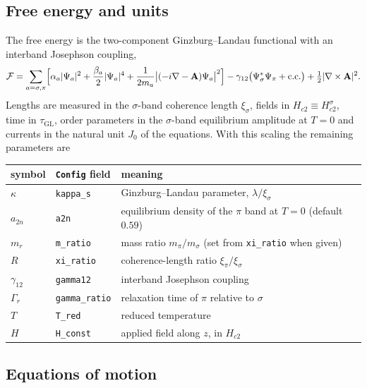 \documentclass[11pt,a4paper]{article}
\newcommand{\Hc}[1]{H_{c#1}}
\newcommand{\tGL}{\tau_{\mathrm{GL}}}
\newcommand{\code}[1]{\texttt{#1}}
\begin{document}
\subsection{Free energy and units}

The free energy is the two-component Ginzburg--Landau functional with an
interband Josephson coupling,
\begin{equation}
  \mathcal{F} = \sum_{a=\sigma,\pi}\Bigl[
      \alpha_a|\Psi_a|^2 + \frac{\beta_a}{2}|\Psi_a|^4
    + \frac{1}{2m_a}\bigl|(-i\nabla-\mathbf{A})\Psi_a\bigr|^2 \Bigr]
  - \gamma_{12}\bigl(\Psi_\sigma^{*}\Psi_\pi+\mathrm{c.c.}\bigr)
  + \tfrac{1}{2}|\nabla\times\mathbf{A}|^2 .
\end{equation}
Lengths are measured in the $\sigma$-band coherence length $\xi_\sigma$,
fields in $\Hc2\equiv\Hc2^\sigma$, time in $\tGL$, order parameters in the
$\sigma$-band equilibrium amplitude at $T=0$ and currents in the natural
unit $J_0$ of the equations. With this scaling the remaining parameters are
\begin{center}
\begin{tabular}{lll}
\toprule
symbol & \code{Config} field & meaning \\
\midrule
$\kappa$ & \code{kappa\_s} & Ginzburg--Landau parameter, $\lambda/\xi_\sigma$ \\
$a_{2n}$ & \code{a2n} & equilibrium density of the $\pi$ band at $T=0$ (default $0.59$) \\
$m_r$ & \code{m\_ratio} & mass ratio $m_\pi/m_\sigma$ (set from \code{xi\_ratio} when given) \\
$R$ & \code{xi\_ratio} & coherence-length ratio $\xi_\pi/\xi_\sigma$ \\
$\gamma_{12}$ & \code{gamma12} & interband Josephson coupling \\
$\Gamma_r$ & \code{gamma\_ratio} & relaxation time of $\pi$ relative to $\sigma$ \\
$T$ & \code{T\_red} & reduced temperature \\
$H$ & \code{H\_const} & applied field along $z$, in $\Hc2$ \\
\bottomrule
\end{tabular}
\end{center}

\subsection{Equations of motion}
\end{document}
